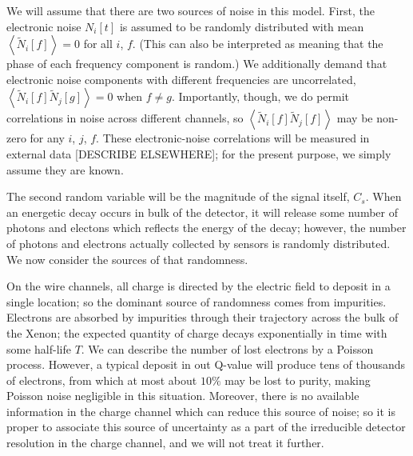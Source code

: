 We will assume that there are two sources of noise in this model.  First, the electronic noise $N_i[t]$ is assumed to be randomly distributed with mean $\left< \widetilde{N}_i[f] \right> = 0$ for all $i$, $f$.  (This can also be interpreted as meaning that the phase of each frequency component is random.)  We additionally demand that electronic noise components with different frequencies are uncorrelated, $\left< \widetilde{N}_i[f] \widetilde{N}_j[g] \right> = 0$ when $f \ne g$.  Importantly, though, we do permit correlations in noise across different channels, so $\left< \widetilde{N}_i[f] \widetilde{N}_j[f] \right>$ may be non-zero for any $i$, $j$, $f$.  These electronic-noise correlations will be measured in external data [DESCRIBE ELSEWHERE]; for the present purpose, we simply assume they are known.

The second random variable will be the magnitude of the signal itself, $C_s$.  When an energetic decay occurs in bulk of the detector, it will release some number of photons and electons which reflects the energy of the decay; however, the number of photons and electrons actually collected by sensors is randomly distributed.  We now consider the sources of that randomness.

On the wire channels, all charge is directed by the electric field to deposit in a single location; so the dominant source of randomness comes from impurities.  Electrons are absorbed by impurities through their trajectory across the bulk of the Xenon; the expected quantity of charge decays exponentially in time with some half-life $T$.  We can describe the number of lost electrons by a Poisson process.  However, a typical deposit in out Q-value will produce tens of thousands of electrons, from which at most about $10\%$ may be lost to purity, making Poisson noise negligible in this situation.  Moreover, there is no available information in the charge channel which can reduce this source of noise; so it is proper to associate this source of uncertainty as a part of the irreducible detector resolution in the charge channel, and we will not treat it further.

